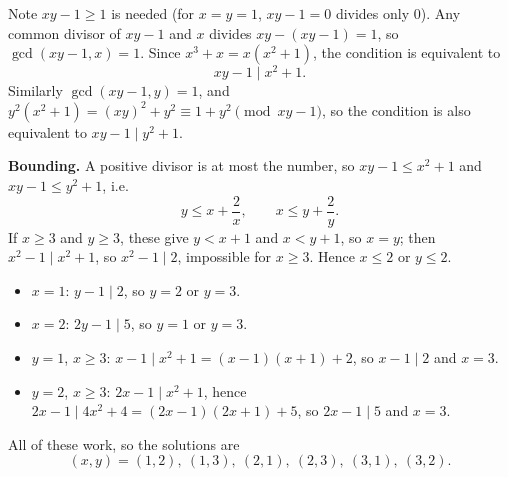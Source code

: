 Note $xy-1\ge1$ is needed (for $x=y=1$, $xy-1=0$ divides only $0$). Any common divisor of $xy-1$ and $x$ divides $xy-(xy-1)=1$, so $\gcd(xy-1,x)=1$. Since $x^3+x=x\left(x^2+1\right)$, the condition is equivalent to
\[xy-1\mid x^2+1.\]
Similarly $\gcd(xy-1,y)=1$, and $y^2\left(x^2+1\right)=(xy)^2+y^2\equiv1+y^2\pmod{xy-1}$, so the condition is also equivalent to $xy-1\mid y^2+1$.

\textbf{Bounding.} A positive divisor is at most the number, so $xy-1\le x^2+1$ and $xy-1\le y^2+1$, i.e.
\[y\le x+\dfrac2x,\qquad x\le y+\dfrac2y.\]
If $x\ge3$ and $y\ge3$, these give $y<x+1$ and $x<y+1$, so $x=y$; then $x^2-1\mid x^2+1$, so $x^2-1\mid2$, impossible for $x\ge3$. Hence $x\le2$ or $y\le2$.
\begin{itemize}
\item $x=1$: $y-1\mid2$, so $y=2$ or $y=3$.
\item $x=2$: $2y-1\mid5$, so $y=1$ or $y=3$.
\item $y=1$, $x\ge3$: $x-1\mid x^2+1=(x-1)(x+1)+2$, so $x-1\mid2$ and $x=3$.
\item $y=2$, $x\ge3$: $2x-1\mid x^2+1$, hence $2x-1\mid4x^2+4=(2x-1)(2x+1)+5$, so $2x-1\mid5$ and $x=3$.
\end{itemize}
All of these work, so the solutions are
\[\boxed{(x,y)=(1,2),\ (1,3),\ (2,1),\ (2,3),\ (3,1),\ (3,2)}.\]
